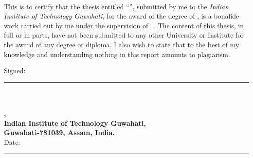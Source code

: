 \documentclass[11pt, a4paper, twoside]{Thesis} %
\begin{document}
\begin{titlepage}
\begin{center}
\textsc{\textbf{\fontsize{31}{32}\selectfont{Declaration}}}\\[2.0cm] %
\end{center}

 \vspace{0.5cm}

This is to certify that the thesis entitled ``\textbf{\thesisTitle}'',
submitted by me to the \textit{Indian Institute of Technology Guwahati}, for the award of the degree of \degreeName, is a
bonafide work carried out by me under the supervision
of \supervisorTitle \ \supervisorName. The content of this thesis, in full or in parts, have not
been submitted to any other University or Institute for the award
of any degree or diploma. I also wish to state that to the best of my knowledge and understanding nothing in this report amounts to plagiarism.

\vspace{3cm}

Signed:\\ \rule[1em]{25em}{0.5pt}\\[0.1cm] %
\textbf{\authorName}\\
\textbf{\departmentName,}\\
\textbf{Indian Institute of Technology Guwahati,}\\
\textbf{Guwahati-781039, Assam, India.}\\[2cm] \hfill{}Date:\\ \rule[1em]{25em}{0.5pt} %
\end{titlepage}


% 

\clearpage %
\end{document}
